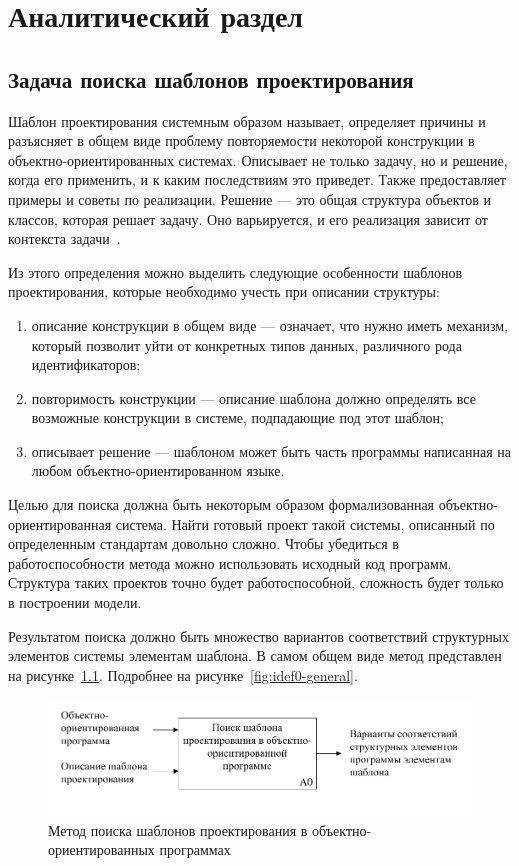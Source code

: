 \chapter{Аналитический раздел}
\label{cha:analysis}

\section{Задача поиска шаблонов проектирования}

Шаблон проектирования системным образом называет, определяет причины и
разъясняет в общем виде проблему повторяемости некоторой конструкции в
объектно-ориентированных системах.
Описывает не только задачу, но и решение, когда его применить, и к каким
последствиям это приведет.
Также предоставляет примеры и советы по реализации.
Решение --- это общая структура объектов и классов, которая решает задачу.
Оно варьируется, и его реализация зависит от контекста задачи~\cite{DesignPatterns}.

Из этого определения можно выделить следующие особенности шаблонов проектирования,
которые необходимо учесть при описании структуры:
\begin{enumerate}
\item описание конструкции в общем виде --- означает, что нужно иметь механизм,
который позволит уйти от конкретных типов данных, различного рода идентификаторов;
\item повторимость конструкции --- описание шаблона должно определять все
возможные конструкции в системе, подпадающие под этот шаблон;
\item описывает решение --- шаблоном может быть часть программы написанная на
любом объектно-ориентированном языке.
\end{enumerate}

Целью для поиска должна быть некоторым образом формализованная
объектно-ориентированная система.
Найти готовый проект такой системы, описанный по определенным стандартам
довольно сложно.
Чтобы убедиться в работоспособности метода можно использовать исходный код
программ.
Структура таких проектов точно будет работоспособной, сложность будет только
в построении модели.

Результатом поиска должно быть множество вариантов соответствий структурных
элементов системы элементам шаблона.
В самом общем виде метод представлен на рисунке~\ref{fig:idef0}.
Подробнее на рисунке~\ref{fig:idef0-general}.

\begin{figure}
\centering
\includegraphics[width=\textwidth]{inc/idef0.pdf}
\caption{Метод поиска шаблонов проектирования в объектно-ориентированных программах}
\label{fig:idef0}
\end{figure}

